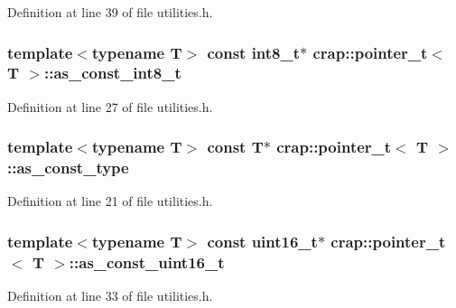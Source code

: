 Definition at line 39 of file utilities.\+h.

\hypertarget{structcrap_1_1pointer__t_a9ce77bbce5a72d780ed726c9c91549d9}{}
\subsubsection[{as\+\_\+const\+\_\+int8\+\_\+t}]{\setlength{\rightskip}{0pt plus 5cm}template$<$typename T$>$ const int8\+\_\+t$\ast$ {\bf crap\+::pointer\+\_\+t}$<$ T $>$\+::as\+\_\+const\+\_\+int8\+\_\+t}\label{structcrap_1_1pointer__t_a9ce77bbce5a72d780ed726c9c91549d9}


Definition at line 27 of file utilities.\+h.

\hypertarget{structcrap_1_1pointer__t_af40ed86c734355aefae597dd8882386c}{}
\subsubsection[{as\+\_\+const\+\_\+type}]{\setlength{\rightskip}{0pt plus 5cm}template$<$typename T$>$ const T$\ast$ {\bf crap\+::pointer\+\_\+t}$<$ T $>$\+::as\+\_\+const\+\_\+type}\label{structcrap_1_1pointer__t_af40ed86c734355aefae597dd8882386c}


Definition at line 21 of file utilities.\+h.

\hypertarget{structcrap_1_1pointer__t_a7404877008ee5b52b04d2278c02987ed}{}
\subsubsection[{as\+\_\+const\+\_\+uint16\+\_\+t}]{\setlength{\rightskip}{0pt plus 5cm}template$<$typename T$>$ const uint16\+\_\+t$\ast$ {\bf crap\+::pointer\+\_\+t}$<$ T $>$\+::as\+\_\+const\+\_\+uint16\+\_\+t}\label{structcrap_1_1pointer__t_a7404877008ee5b52b04d2278c02987ed}


Definition at line 33 of file utilities.\+h.

